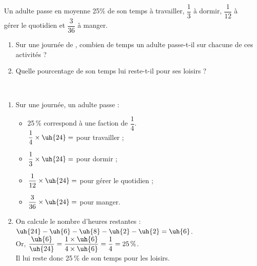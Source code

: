 
\begin{exercice*}
   Un adulte passe en moyenne 25\% de son temps à travailler, $\dfrac13$ à dormir, $\dfrac{1}{12}$ à gérer le quotidien et $\dfrac{3}{36}$ à manger.
   \begin{enumerate}
      \item Sur une journée de , combien de temps un adulte passe-t-il sur chacune de ces activités ?
      \item Quelle pourcentage de son temps lui reste-t-il pour ses loisirs ?
   \end{enumerate}
\end{exercice*}

\begin{corrige}
   \ \\ [-5mm]
   \begin{enumerate}
      \item Sur une journée, un adulte passe : \smallskip
      \begin{itemize}
         \item 25\,\% correspond à une faction de $\dfrac14$. \\ [2mm]
            \quad $\dfrac14\times\uh{24} =$ {\red {} pour travailler} ; \\ [2mm]
         \item $\dfrac13\times\uh{24} =$ {\red {} pour dormir} ; \\ [2mm]
         \item $\dfrac1{12}\times\uh{24} =$ {\red {} pour gérer le quotidien} ; \\ [2mm]
         \item $\dfrac{3}{36}\times\uh{24} =$ {\red {} pour manger.} \\ [3mm]
      \end{itemize}
      \item On calcule le nombre d'heures restantes : \\
          $\uh{24}-\uh{6}-\uh{8}-\uh{2}-\uh{2} =\uh{6}$. \\ [2mm]
         Or, $\dfrac{\uh{6}}{\uh{24}} =\dfrac{1\times\uh{6}}{4\times\uh{6}} =\dfrac14 =25\,\%$. \\ [2mm]
         {\red Il lui reste donc 25\,\% de son temps pour les loisirs}. \bigskip
   \end{enumerate} 
\end{corrige}
